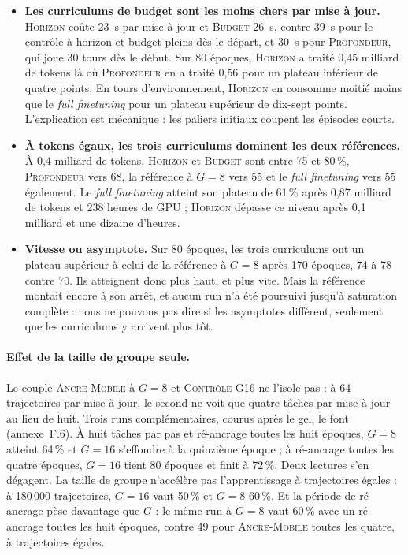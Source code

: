 \documentclass[11pt,a4paper]{article}
\begin{document}
\begin{itemize}
    \item \textbf{Les curriculums de budget sont les moins chers par mise à jour.} \textsc{Horizon} coûte 23~s par mise à jour et \textsc{Budget} 26~s, contre 39~s pour le contrôle à horizon et budget pleins dès le départ, et 30~s pour \textsc{Profondeur}, qui joue 30 tours dès le début. Sur 80 époques, \textsc{Horizon} a traité 0{,}45 milliard de tokens là où \textsc{Profondeur} en a traité 0{,}56 pour un plateau inférieur de quatre points. En tours d'environnement, \textsc{Horizon} en consomme moitié moins que le \emph{full finetuning} pour un plateau supérieur de dix-sept points. L'explication est mécanique : les paliers initiaux coupent les épisodes courts.
    \item \textbf{À tokens égaux, les trois curriculums dominent les deux références.} À 0{,}4 milliard de tokens, \textsc{Horizon} et \textsc{Budget} sont entre 75 et 80\,\%, \textsc{Profondeur} vers 68, la référence à $G=8$ vers 55 et le \emph{full finetuning} vers 55 également. Le \emph{full finetuning} atteint son plateau de 61\,\% après 0{,}87 milliard de tokens et 238 heures de GPU ; \textsc{Horizon} dépasse ce niveau après 0{,}1 milliard et une dizaine d'heures.
    \item \textbf{Vitesse ou asymptote.} Sur 80 époques, les trois curriculums ont un plateau supérieur à celui de la référence à $G=8$ après 170 époques, 74 à 78 contre 70. Ils atteignent donc plus haut, et plus vite. Mais la référence montait encore à son arrêt, et aucun run n'a été poursuivi jusqu'à saturation complète : nous ne pouvons pas dire si les asymptotes diffèrent, seulement que les curriculums y arrivent plus tôt.
\end{itemize}

\paragraph{Effet de la taille de groupe seule.} Le couple \textsc{Ancre-Mobile} à $G=8$ et \textsc{Contrôle-G16} ne l'isole pas : à 64 trajectoires par mise à jour, le second ne voit que quatre tâches par mise à jour au lieu de huit. Trois runs complémentaires, courus après le gel, le font (annexe~F.6). À huit tâches par pas et ré-ancrage toutes les huit époques, $G=8$ atteint 64\,\% et $G=16$ s'effondre à la quinzième époque ; à ré-ancrage toutes les quatre époques, $G=16$ tient 80 époques et finit à 72\,\%. Deux lectures s'en dégagent. La taille de groupe n'accélère pas l'apprentissage à trajectoires égales : à 180\,000 trajectoires, $G=16$ vaut 50\,\% et $G=8$ 60\,\%. Et la période de ré-ancrage pèse davantage que $G$ : le même run à $G=8$ vaut 60\,\% avec un ré-ancrage toutes les huit époques, contre 49 pour \textsc{Ancre-Mobile} toutes les quatre, à trajectoires égales.
\end{document}

